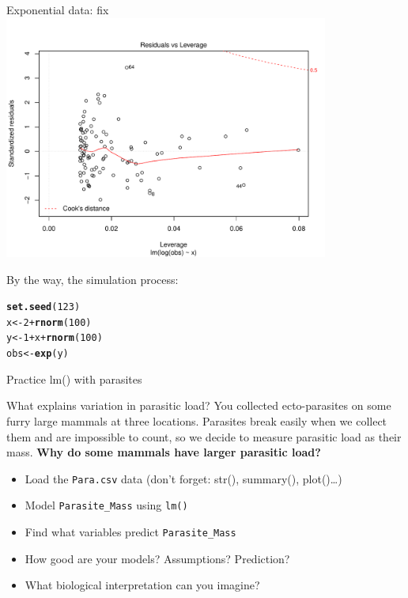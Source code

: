 \documentclass[10pt]{beamer}\usepackage[]{graphicx}\usepackage[]{color}
\makeatletter
\newcommand{\hlnum}[1]{\textcolor[rgb]{0.686,0.059,0.569}{#1}}%
\newcommand{\hlopt}[1]{\textcolor[rgb]{0,0,0}{#1}}%
\newcommand{\hlstd}[1]{\textcolor[rgb]{0.345,0.345,0.345}{#1}}%
\newcommand{\hlkwb}[1]{\textcolor[rgb]{0.69,0.353,0.396}{#1}}%
\newcommand{\hlkwd}[1]{\textcolor[rgb]{0.737,0.353,0.396}{\textbf{#1}}}%
\newenvironment{kframe}{%
 \def\at@end@of@kframe{}%
 \ifinner\ifhmode%
  \def\at@end@of@kframe{\end{minipage}}%
  \begin{minipage}{\columnwidth}%
 \fi\fi%
 \def\FrameCommand##1{\hskip\@totalleftmargin \hskip-\fboxsep
 \colorbox{shadecolor}{##1}\hskip-\fboxsep
     \hskip-\linewidth \hskip-\@totalleftmargin \hskip\columnwidth}%
 \MakeFramed {\advance\hsize-\width
   \@totalleftmargin\z@ \linewidth\hsize
   \@setminipage}}%
 {\par\unskip\endMakeFramed%
 \at@end@of@kframe}
\newenvironment{knitrout}{}{} %
\makeatother
\begin{document}
\begin{frame}[fragile]{Exponential data: fix}
\begin{knitrout}
\includegraphics[width=0.8\textwidth,height=0.6\textwidth]{figure/unnamed-chunk-25-5} 

\end{knitrout}

\pause
By the way, the simulation process:
\begin{knitrout}
\color{fgcolor}\begin{kframe}
\begin{alltt}
\hlkwd{set.seed}\hlstd{(}\hlnum{123}\hlstd{)}
\hlstd{x} \hlkwb{<-} \hlnum{2}\hlopt{+}\hlkwd{rnorm}\hlstd{(}\hlnum{100}\hlstd{)}
\hlstd{y} \hlkwb{<-} \hlnum{1} \hlopt{+} \hlstd{x} \hlopt{+} \hlkwd{rnorm}\hlstd{(}\hlnum{100}\hlstd{)}
\hlstd{obs} \hlkwb{<-} \hlkwd{exp}\hlstd{(y)}
\end{alltt}
\end{kframe}
\end{knitrout}

\end{frame}


\begin{frame}[fragile]{Practice lm() with parasites}


  
  \begin{alertblock}{What explains variation in parasitic load?}
  You collected ecto-parasites on some furry large mammals at three locations. Parasites break easily when we collect them and are impossible to count, so we decide to measure parasitic load as their mass. \textbf{Why do some mammals have larger parasitic load?} \pause
    \begin{itemize}
      \item Load the \texttt{Para.csv} data (don't forget: str(), summary(), plot()\dots)
      \item Model \verb+Parasite_Mass+ using \texttt{lm()}
      \item Find what variables predict \verb+Parasite_Mass+
      \item How good are your models? Assumptions? Prediction?
      \item What biological interpretation can you imagine?
      \end{itemize}
  \end{alertblock}
  
\end{frame}
\end{document}
